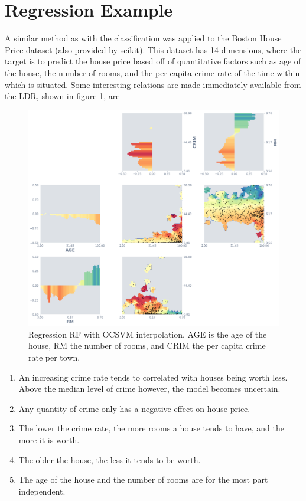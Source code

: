 \documentclass[a4paper, twocolumn]{article}
\begin{document}
\section{Regression Example}

A similar method as with the classification was applied to the Boston House Price dataset \cite{bostonhouse} (also provided by scikit). This dataset has 14 dimensions, where the target is to predict the house price based off of quantitative factors such as age of the house, the number of rooms, and the per capita crime rate of the time within which is situated. Some interesting relations are made immediately available from the LDR, shown in figure \ref{fig:reg-rf-ocsvm-matrix}, are

\begin{figure}
\centering
\includegraphics[width=\columnwidth]{img/reg_rf_ocsvm_matrix.png}
\caption{Regression RF with OCSVM interpolation. AGE is the age of the house, RM the number of rooms, and CRIM the per capita crime rate per town.}
\label{fig:reg-rf-ocsvm-matrix}
\end{figure}

\begin{enumerate}
\item An increasing crime rate tends to correlated with houses being worth less. Above the median level of crime however, the model becomes uncertain.
\item Any quantity of crime only has a negative effect on house price.
\item The lower the crime rate, the more rooms a house tends to have, and the more it is worth.
\item The older the house, the less it tends to be worth.
\item The age of the house and the number of rooms are for the most part independent.
\end{enumerate}
\end{document}
